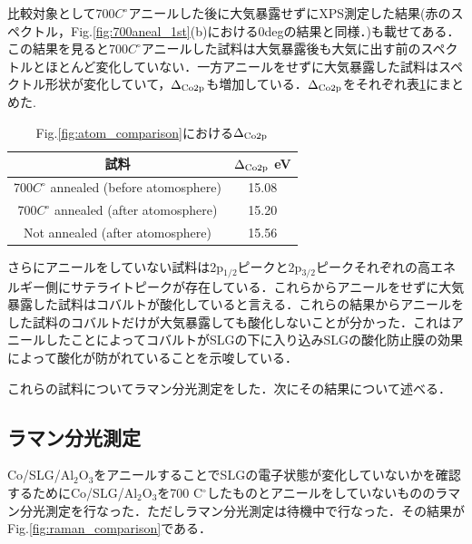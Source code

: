 {比較対象として700$C^{\circ}$アニールした後に大気暴露せずにXPS測定した結果(赤のスペクトル，Fig.\ref{fig:700aneal_1st}(b)における0degの結果と同様．)も載せてある．この結果を見ると700$C^{\circ}$アニールした試料は大気暴露後も大気に出す前のスペクトルとほとんど変化していない．一方アニールをせずに大気暴露した試料はスペクトル形状が変化していて，$\Delta_{\rm Co2p}$も増加している．$\Delta_{\rm Co2p}$をそれぞれ表\ref{tb:atom_comparison}にまとめた.

\begin{table}[htbp]
 \caption{Fig.\ref{fig:atom_comparison}における$\Delta_{\rm Co2p}$}
 \begin{center}
  \begin{tabular}{cc}\toprule
  	試料	&	$\Delta_{\rm Co2p}$	eV	\\	
  	\hline
	700$C^{\circ}$ annealed	(before atomosphere)&	15.08						\\
	700$C^{\circ}$ annealed	(after atomosphere)&	15.20		
	\\
	Not annealed (after atomosphere)&  15.56  
						\\	\bottomrule
  \end{tabular}
 \end{center}
 \label{tb:atom_comparison}
\end{table}




さらにアニールをしていない試料は2p$_{1/2}$ピークと2p$_{3/2}$ピークそれぞれの高エネルギー側にサテライトピークが存在している．これらからアニールをせずに大気暴露した試料はコバルトが酸化していると言える．これらの結果からアニールをした試料のコバルトだけが大気暴露しても酸化しないことが分かった．これはアニールしたことによってコバルトがSLGの下に入り込みSLGの酸化防止膜の効果によって酸化が防がれていることを示唆している．

これらの試料についてラマン分光測定をした．次にその結果について述べる．

\subsection{ラマン分光測定}

Co/SLG/Al$_{2}$O$_{3}$をアニールすることでSLGの電子状態が変化していないかを確認するためにCo/SLG/Al$_{2}$O$_{3}$を700 C$^{\circ}$したものとアニールをしていないもののラマン分光測定を行なった．ただしラマン分光測定は待機中で行なった．その結果がFig.\ref{fig:raman_comparison}である．

}

